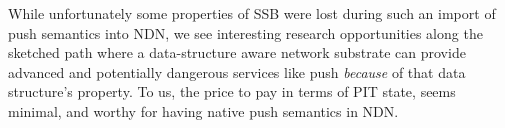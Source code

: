 \documentclass[9pt,sigconf]{acmart}
\begin{document}
While unfortunately some properties of SSB were lost during such an
import of push semantics into NDN, we see interesting research
opportunities along the sketched path where a data-structure aware
network substrate can provide advanced and potentially dangerous
services like push {\em because} of that data structure's property. To
us, the price to pay in terms of PIT state, seems minimal, and
worthy for having native push semantics in NDN.





\end{document}
